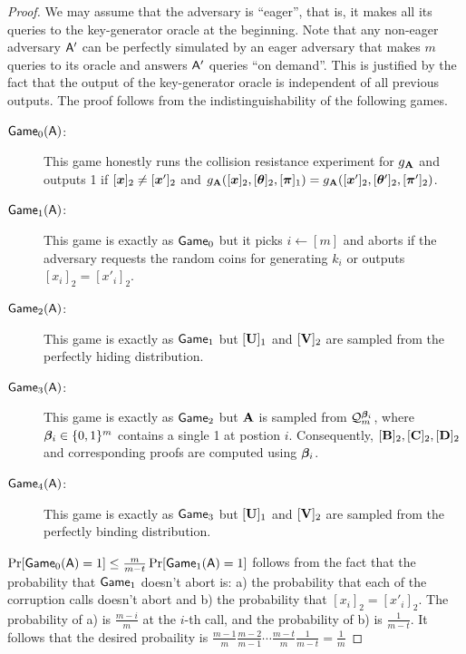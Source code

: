 \begin{proof}
We may assume that the adversary is ``eager'', that is, it makes all its queries to the key-generator oracle at the beginning. Note that any non-eager adversary $\mathsf{A}'$ can be perfectly simulated  by an eager adversary that makes $m$ queries to its oracle and answers $\mathsf{A}'$ queries ``on demand''. This is justified by the fact that the output of the key-generator oracle is independent of all previous outputs.
The proof follows from the indistinguishability of the following games.
\begin{description}
\item[$\mathsf{Game}_0(\mathsf{A})$:] This game honestly runs the collision resistance experiment for $g_{\mathbf{{A}}}$ and outputs 1 if $[{\boldsymbol{x}}]_2 \neq [{\boldsymbol{x}}']_2$ and $g_{\mathbf{{A}}}([{\boldsymbol{x}}]_2,[{\boldsymbol{\theta}}]_2,[{\boldsymbol{\pi}}]_1)=g_{\mathbf{{A}}}([{\boldsymbol{x}}']_2,[{\boldsymbol{\theta}}']_2,[{\boldsymbol{\pi}}']_2)$.
\item[$\mathsf{Game}_1(\mathsf{A})$:] This game is exactly as $\mathsf{Game}_0$ but it picks $i\gets[m]$ and aborts if the adversary requests the random coins for generating $k_i$ or outputs $[x_i]_2=[x'_i]_2$.
\item[$\mathsf{Game}_2(\mathsf{A})$:] This game is exactly as $\mathsf{Game}_1$ but $[\mathbf{{U}}]_1$ and $[\mathbf{{V}}]_2$ are sampled from the perfectly hiding distribution.
\item[$\mathsf{Game}_3(\mathsf{A})$:] This game is exactly as $\mathsf{Game}_2$ but $\mathbf{{A}}$ is sampled from $\mathcal{Q}_m^{{\boldsymbol{\beta}}_i}$, where ${\boldsymbol{\beta}}_i\in\{0,1\}^m$ contains a single 1 at postion $i$. Consequently, $[\mathbf{{B}}]_2,[\mathbf{{C}}]_2,[\mathbf{{D}}]_2$ and corresponding proofs are computed using ${\boldsymbol{\beta}}_i$.
\item[$\mathsf{Game}_4(\mathsf{A})$:] This game is exactly as $\mathsf{Game}_3$ but $[\mathbf{{U}}]_1$ and $[\mathbf{{V}}]_2$ are sampled from the perfectly binding distribution.
\end{description}
$\Pr[\mathsf{Game}_0(\mathsf{A})=1]\leq \frac{m}{m-t}\Pr[\mathsf{Game}_1(\mathsf{A})=1]$  follows from the fact that the probability that $\mathsf{Game}_1$ doesn't abort is: a) the probability that each of the corruption calls doesn't abort and b) the probability that $[x_i]_2=[x'_i]_2$. The probability of a) is $\frac{m-i}{m}$ at the $i$-th call, and the probability of b) is $\frac{1}{m-t}$. It follows that the desired probaility is $\frac{m-1}{m}\frac{m-2}{m-1}\cdots\frac{m-t}{m}\frac{1}{m-t}=\frac{1}{m}$


\end{proof}
